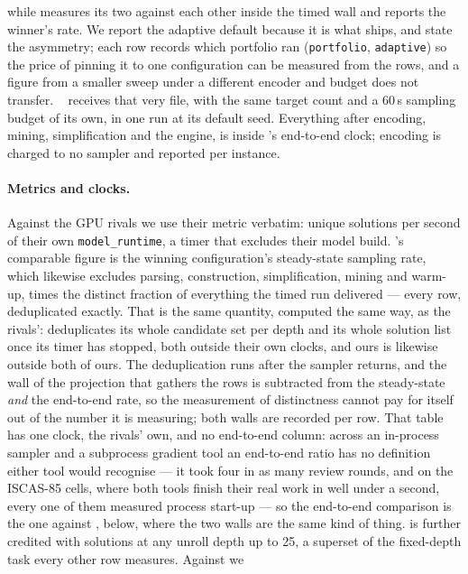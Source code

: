 while \gpap{} measures its two against each other inside the timed wall and reports the
winner's rate. We report the adaptive default because it is what ships, and state the asymmetry; each row
records which portfolio ran (\texttt{portfolio}, \texttt{adaptive}) so the price of pinning it
to one configuration can be measured from the rows, and a figure from a smaller sweep under a
different encoder and budget does not transfer.
\cmsgen{}~\cite{cmsgen} receives that very \cnf{} file, with the same target count and a
60\,s sampling budget of its own, in one run at its default seed. Everything after encoding,
mining, simplification and the engine, is inside \gpap{}'s end-to-end clock; encoding is
charged to no sampler and reported per instance.

\paragraph{Metrics and clocks.}
Against the GPU rivals we use their metric verbatim: unique solutions per second of their own
\texttt{model\_runtime}, a timer that excludes their model build. \gpap{}'s comparable figure
is the winning configuration's steady-state sampling rate, which likewise excludes parsing,
construction, simplification, mining and warm-up, times the distinct fraction of everything the
timed run delivered --- every row, deduplicated exactly. That is the same quantity, computed the
same way, as the rivals': \recurrent{} deduplicates its whole candidate set per depth and
\demotic{} its whole solution list once its timer has stopped, both outside their own clocks, and
ours is likewise outside both of ours. The deduplication runs after the sampler returns, and the
wall of the projection that gathers the rows is subtracted from the steady-state \emph{and} the
end-to-end rate, so the measurement of distinctness cannot pay for itself out of the number it
is measuring; both walls are recorded per row. That table has one clock, the rivals' own, and no
end-to-end column: across an in-process sampler and a subprocess gradient tool an end-to-end
ratio has no definition either tool would recognise --- it took four in as many review rounds,
and on the ISCAS-85 cells, where both tools finish their real work in well under a second, every
one of them measured process start-up --- so the end-to-end comparison is the one against
\cmsgen{}, below, where the two walls are the same kind of thing.
\recurrent{} is further credited with solutions at any unroll depth
up to 25, a superset of the fixed-depth task every other row measures. Against \cmsgen{} we
